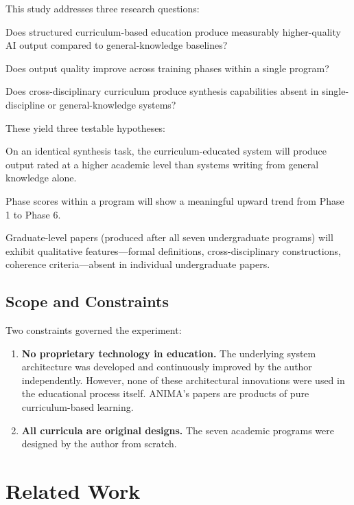 \documentclass[11pt,a4paper]{article}
\begin{document}
This study addresses three research questions:
\begin{description}[nosep]
  \item[RQ1] Does structured curriculum-based education produce measurably higher-quality AI output compared to general-knowledge baselines?
  \item[RQ2] Does output quality improve across training phases within a single program?
  \item[RQ3] Does cross-disciplinary curriculum produce synthesis capabilities absent in single-discipline or general-knowledge systems?
\end{description}

These yield three testable hypotheses:
\begin{description}[nosep]
  \item[H1] On an identical synthesis task, the curriculum-educated system will produce output rated at a higher academic level than systems writing from general knowledge alone.
  \item[H2] Phase scores within a program will show a meaningful upward trend from Phase 1 to Phase 6.
  \item[H3] Graduate-level papers (produced after all seven undergraduate programs) will exhibit qualitative features---formal definitions, cross-disciplinary constructions, coherence criteria---absent in individual undergraduate papers.
\end{description}

\subsection{Scope and Constraints}
Two constraints governed the experiment:
\begin{enumerate}[nosep]
  \item \textbf{No proprietary technology in education.} The underlying system architecture was developed and continuously improved by the author independently. However, none of these architectural innovations were used in the educational process itself. ANIMA's papers are products of pure curriculum-based learning.
  \item \textbf{All curricula are original designs.} The seven academic programs were designed by the author from scratch.
\end{enumerate}

\section{Related Work}\label{sec:related}
\end{document}
